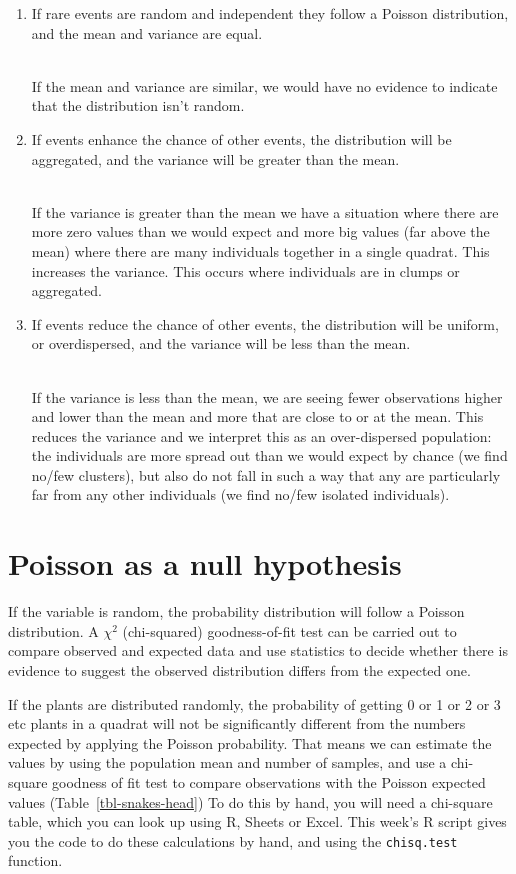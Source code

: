 \documentclass[
  letterpaper,
  DIV=11,
  numbers=noendperiod]{scrreprt}
\begin{document}
\begin{enumerate}
\def\labelenumi{\arabic{enumi}.}
\item
  If rare events are random and independent they follow a Poisson
  distribution, and the mean and variance are equal.\\
  \strut \\
  If the mean and variance are similar, we would have no evidence to
  indicate that the distribution isn't random.\\
\item
  If events enhance the chance of other events, the distribution will be
  aggregated, and the variance will be greater than the mean.\\
  \strut \\
  If the variance is greater than the mean we have a situation where
  there are more zero values than we would expect and more big values
  (far above the mean) where there are many individuals together in a
  single quadrat. This increases the variance. This occurs where
  individuals are in clumps or aggregated.
\item
  If events reduce the chance of other events, the distribution will be
  uniform, or overdispersed, and the variance will be less than the
  mean.\\
  \strut \\
  If the variance is less than the mean, we are seeing fewer
  observations higher and lower than the mean and more that are close to
  or at the mean. This reduces the variance and we interpret this as an
  over-dispersed population: the individuals are more spread out than we
  would expect by chance (we find no/few clusters), but also do not fall
  in such a way that any are particularly far from any other individuals
  (we find no/few isolated individuals).
\end{enumerate}

\section{Poisson as a null
hypothesis}\label{poisson-as-a-null-hypothesis}

If the variable is random, the probability distribution will follow a
Poisson distribution. A \(\chi^2\) (chi-squared) goodness-of-fit test
can be carried out to compare observed and expected data and use
statistics to decide whether there is evidence to suggest the observed
distribution differs from the expected one.

If the plants are distributed randomly, the probability of getting 0 or
1 or 2 or 3 etc plants in a quadrat will not be significantly different
from the numbers expected by applying the Poisson probability. That
means we can estimate the values by using the population mean and number
of samples, and use a chi-square goodness of fit test to compare
observations with the Poisson expected values
(Table~\ref{tbl-snakes-head}) To do this by hand, you will need a
chi-square table, which you can look up using R, Sheets or Excel. This
week's R script gives you the code to do these calculations by hand, and
using the \texttt{chisq.test} function.
\end{document}
